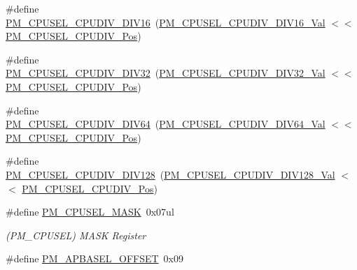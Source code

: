 \begin{DoxyCompactItemize}
\item 
\#define \mbox{\hyperlink{group___s_a_m_d21___p_m_gac57d87a95544dcce186a8364bc305b2c}{P\+M\+\_\+\+C\+P\+U\+S\+E\+L\+\_\+\+C\+P\+U\+D\+I\+V\+\_\+\+D\+I\+V16}}~(\mbox{\hyperlink{group___s_a_m_d21___p_m_ga83eb5a5818cbb1e1db62be217ae6ee89}{P\+M\+\_\+\+C\+P\+U\+S\+E\+L\+\_\+\+C\+P\+U\+D\+I\+V\+\_\+\+D\+I\+V16\+\_\+\+Val}}    $<$$<$ \mbox{\hyperlink{group___s_a_m_d21___p_m_ga06001ff79ade30f0557224810a94c5e1}{P\+M\+\_\+\+C\+P\+U\+S\+E\+L\+\_\+\+C\+P\+U\+D\+I\+V\+\_\+\+Pos}})
\item 
\#define \mbox{\hyperlink{group___s_a_m_d21___p_m_ga7e2779bd7ed9c712d7b1f9ee4e287345}{P\+M\+\_\+\+C\+P\+U\+S\+E\+L\+\_\+\+C\+P\+U\+D\+I\+V\+\_\+\+D\+I\+V32}}~(\mbox{\hyperlink{group___s_a_m_d21___p_m_ga12dbe758dba92e2bec74eea6ad210df6}{P\+M\+\_\+\+C\+P\+U\+S\+E\+L\+\_\+\+C\+P\+U\+D\+I\+V\+\_\+\+D\+I\+V32\+\_\+\+Val}}    $<$$<$ \mbox{\hyperlink{group___s_a_m_d21___p_m_ga06001ff79ade30f0557224810a94c5e1}{P\+M\+\_\+\+C\+P\+U\+S\+E\+L\+\_\+\+C\+P\+U\+D\+I\+V\+\_\+\+Pos}})
\item 
\#define \mbox{\hyperlink{group___s_a_m_d21___p_m_gac6fb257849e7dc6c42b2c050703a303e}{P\+M\+\_\+\+C\+P\+U\+S\+E\+L\+\_\+\+C\+P\+U\+D\+I\+V\+\_\+\+D\+I\+V64}}~(\mbox{\hyperlink{group___s_a_m_d21___p_m_ga10cdb3447b7fbd67caffd85316805abd}{P\+M\+\_\+\+C\+P\+U\+S\+E\+L\+\_\+\+C\+P\+U\+D\+I\+V\+\_\+\+D\+I\+V64\+\_\+\+Val}}    $<$$<$ \mbox{\hyperlink{group___s_a_m_d21___p_m_ga06001ff79ade30f0557224810a94c5e1}{P\+M\+\_\+\+C\+P\+U\+S\+E\+L\+\_\+\+C\+P\+U\+D\+I\+V\+\_\+\+Pos}})
\item 
\#define \mbox{\hyperlink{group___s_a_m_d21___p_m_ga20c3e32a67ac7a415858d6b2b36e0062}{P\+M\+\_\+\+C\+P\+U\+S\+E\+L\+\_\+\+C\+P\+U\+D\+I\+V\+\_\+\+D\+I\+V128}}~(\mbox{\hyperlink{group___s_a_m_d21___p_m_ga938d0dc17eb7f696a8a4b159bcd4721d}{P\+M\+\_\+\+C\+P\+U\+S\+E\+L\+\_\+\+C\+P\+U\+D\+I\+V\+\_\+\+D\+I\+V128\+\_\+\+Val}}   $<$$<$ \mbox{\hyperlink{group___s_a_m_d21___p_m_ga06001ff79ade30f0557224810a94c5e1}{P\+M\+\_\+\+C\+P\+U\+S\+E\+L\+\_\+\+C\+P\+U\+D\+I\+V\+\_\+\+Pos}})
\item 
\#define \mbox{\hyperlink{group___s_a_m_d21___p_m_gac19d6e70161078340535fd59cfe6228f}{P\+M\+\_\+\+C\+P\+U\+S\+E\+L\+\_\+\+M\+A\+SK}}~0x07ul
\begin{DoxyCompactList}\small\item\em (P\+M\+\_\+\+C\+P\+U\+S\+EL) M\+A\+SK Register \end{DoxyCompactList}\item 
\#define \mbox{\hyperlink{group___s_a_m_d21___p_m_ga53a0465e379f54f56b32bb2ab94eb70e}{P\+M\+\_\+\+A\+P\+B\+A\+S\+E\+L\+\_\+\+O\+F\+F\+S\+ET}}~0x09

\end{DoxyCompactItemize}
